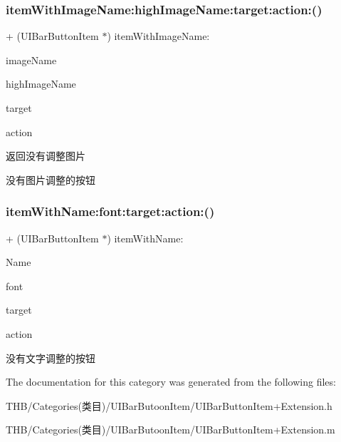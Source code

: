 \subsubsection{\texorpdfstring{item\+With\+Image\+Name\+:high\+Image\+Name\+:target\+:action\+:()}{itemWithImageName:highImageName:target:action:()}}
{\footnotesize\ttfamily + (U\+I\+Bar\+Button\+Item $\ast$) item\+With\+Image\+Name\+: \begin{DoxyParamCaption}\item[{(N\+S\+String $\ast$)}]{image\+Name }\item[{highImageName:(N\+S\+String $\ast$)}]{high\+Image\+Name }\item[{target:(id)}]{target }\item[{action:(S\+EL)}]{action }\end{DoxyParamCaption}}

返回没有调整图片

没有图片调整的按钮 \mbox{\label{category_u_i_bar_button_item_07_extension_08_ab8eb72d80e7b0a1eb6c6a603180c1829}} 
\subsubsection{\texorpdfstring{item\+With\+Name\+:font\+:target\+:action\+:()}{itemWithName:font:target:action:()}}
{\footnotesize\ttfamily + (U\+I\+Bar\+Button\+Item $\ast$) item\+With\+Name\+: \begin{DoxyParamCaption}\item[{(N\+S\+String $\ast$)}]{Name }\item[{font:(C\+G\+Float)}]{font }\item[{target:(id)}]{target }\item[{action:(S\+EL)}]{action }\end{DoxyParamCaption}}

没有文字调整的按钮 

The documentation for this category was generated from the following files\+:\begin{DoxyCompactItemize}
\item 
T\+H\+B/\+Categories(类目)/\+U\+I\+Bar\+Butoon\+Item/U\+I\+Bar\+Button\+Item+\+Extension.\+h\item 
T\+H\+B/\+Categories(类目)/\+U\+I\+Bar\+Butoon\+Item/U\+I\+Bar\+Button\+Item+\+Extension.\+m\end{DoxyCompactItemize}
